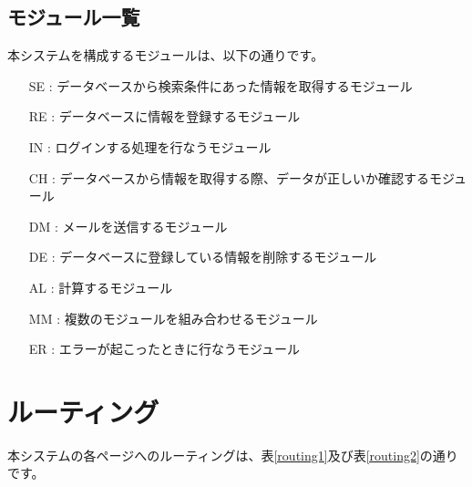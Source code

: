 \documentclass[a4j,titlepage]{jarticle}
\begin{document}
\subsection{モジュール一覧}
本システムを構成するモジュールは、以下の通りです。
\begin{enumerate}
\item [SE] : データベースから検索条件にあった情報を取得するモジュール
\item [RE] : データベースに情報を登録するモジュール
\item [IN] : ログインする処理を行なうモジュール
\item [CH] : データベースから情報を取得する際、データが正しいか確認するモジュール
\item [DM] : メールを送信するモジュール
\item [DE] : データベースに登録している情報を削除するモジュール
\item [AL] : 計算するモジュール
\item [MM] : 複数のモジュールを組み合わせるモジュール
\item [ER] : エラーが起こったときに行なうモジュール
\end{enumerate}

\clearpage

\section{ルーティング}
本システムの各ページへのルーティングは、表\ref{routing1}及び表\ref{routing2}の通りです。
\end{document}
